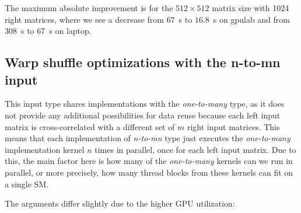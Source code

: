 The maximum absolute improvement is for the $512 \times 512$ matrix size with 1024 right matrices, where we see a decrease from $67$~s to $16.8$~s on gpulab and from $308$~s to $67$~s on laptop.

\subsection{Warp shuffle optimizations with the n-to-mn input}
This input type shares implementations with the \textit{one-to-many} type, as it does not provide any additional possibilities for data reuse because each left input matrix is cross-correlated with a different set of $m$ right input matrices. This means that each implementation of \textit{n-to-mn} type just executes the \textit{one-to-many} implementation kernel $n$ times in parallel, once for each left input matrix. Due to this, the main factor here is how many of the \textit{one-to-many} kernels can we run in parallel, or more precisely, how many thread blocks from these kernels can fit on a single SM.

The arguments differ slightly due to the higher GPU utilization:

